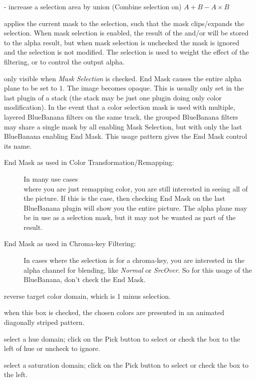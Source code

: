 \begin{description}
    - increase a selection area by union (Combine selection on) $A+B-A\times B$
    \item[Mask Selection] applies the current mask to the selection, such that the mask clips/expands the selection. When mask selection is enabled, the result of the and/or will be stored to the alpha result, but when mask selection is unchecked the mask is ignored and the selection is not modified. The selection is used to weight the effect of the filtering, or to control the output alpha.
    \item[End mask] only visible when \textit{Mask Selection} is checked. End Mask causes the entire alpha plane to
    be set to $1$. The image becomes opaque. This is usually only set in the last plugin of a stack (the stack may be just one plugin doing only color modification). In the event that a color selection mask is used with multiple, layered BlueBanana filters on the same track, the grouped BlueBanana filters may share a single mask by all enabling Mask Selection, but with only the last BlueBanana enabling End Mask. This usage pattern gives the End Mask control its name.
    \begin{description}
        \item[End Mask as used in Color Transformation/Remapping:] In many use cases \\
        where you are just remapping color, you are still interested in seeing all of the picture. If this is the case, then checking End Mask on the last BlueBanana plugin will show you the entire picture. The alpha plane may be in use as a selection mask, but it may not be wanted as part of the result.
        \item[End Mask as used in Chroma-key Filtering:] In cases where the selection is for a chroma-key, you are interested in the alpha channel for blending, like \textit{Normal} or \textit{SrcOver}. So for this usage of the BlueBanana, don't check the End Mask.
    \end{description}
    \item[Invert Selection] reverse target color domain, which is 1 minus selection.
    \item[Mark Selected Areas] when this box is checked, the chosen colors are presented in an animated
    diagonally striped pattern.
    \item[Hue] select a hue domain; click on the Pick button to select or check the box to the left of hue or uncheck to ignore.
    \item[Saturation] select a saturation domain; click on the Pick button to select or check the box to the left.

\end{description}
